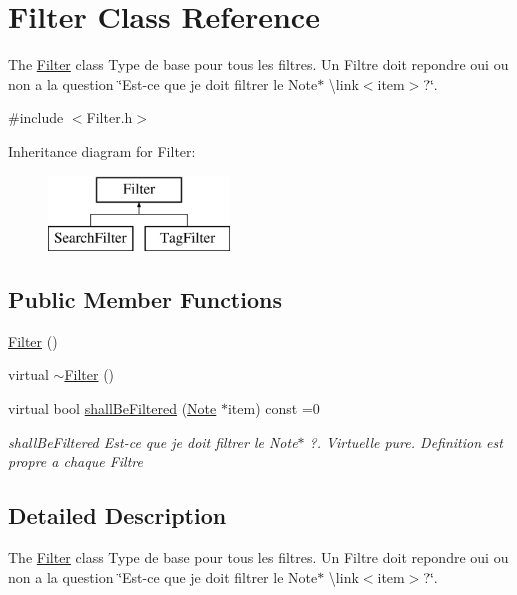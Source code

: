 \hypertarget{class_filter}{\section{Filter Class Reference}
\label{class_filter}
}


The \hyperlink{class_filter}{Filter} class Type de base pour tous les filtres. Un Filtre doit repondre oui ou non a la question \char`\"{}\-Est-\/ce que je doit filtrer le Note$\ast$ \textbackslash{}link$<$item$>$?\char`\"{}.  




{\ttfamily \#include $<$Filter.\-h$>$}

Inheritance diagram for Filter\-:\begin{figure}[H]
\begin{center}
\leavevmode
\includegraphics[height=2.000000cm]{class_filter}
\end{center}
\end{figure}
\subsection*{Public Member Functions}
\begin{DoxyCompactItemize}
\item 
\hyperlink{class_filter_ad15994c30d497afd567a6445446a249e}{Filter} ()
\item 
virtual \hyperlink{class_filter_aa37dc017d133404b3a326f363ce36b8a}{$\sim$\-Filter} ()
\item 
virtual bool \hyperlink{class_filter_af0b4eefe3872bf39748dd9db840e0a61}{shall\-Be\-Filtered} (\hyperlink{class_note}{Note} $\ast$item) const =0
\begin{DoxyCompactList}\small\item\em shall\-Be\-Filtered Est-\/ce que je doit filtrer le Note$\ast$ ?. Virtuelle pure. Definition est propre a chaque Filtre \end{DoxyCompactList}\end{DoxyCompactItemize}


\subsection{Detailed Description}
The \hyperlink{class_filter}{Filter} class Type de base pour tous les filtres. Un Filtre doit repondre oui ou non a la question \char`\"{}\-Est-\/ce que je doit filtrer le Note$\ast$ \textbackslash{}link$<$item$>$?\char`\"{}. 

